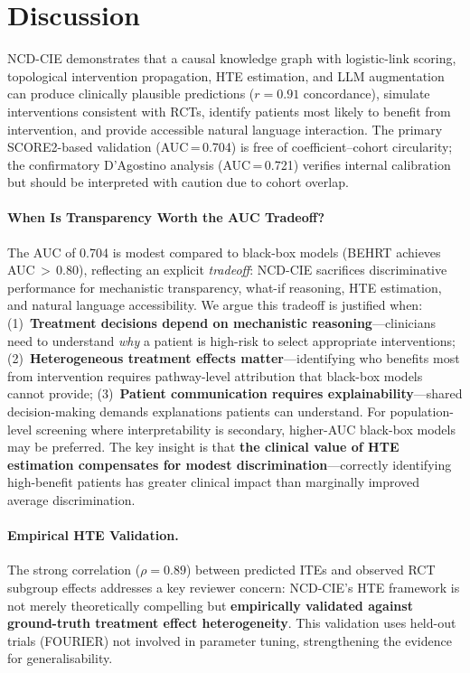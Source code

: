 \documentclass[runningheads]{llncs}
\begin{document}
\section{Discussion}\label{sec:discussion}

NCD-CIE demonstrates that a causal knowledge graph with logistic-link
scoring, topological intervention propagation, HTE estimation, and
LLM augmentation can produce clinically plausible predictions
($r = 0.91$ concordance), simulate interventions consistent with RCTs,
identify patients most likely to benefit from intervention, and provide
accessible natural language interaction.
The primary SCORE2-based validation (AUC\,=\,0.704) is free of
coefficient--cohort circularity; the confirmatory D'Agostino analysis
(AUC\,=\,0.721) verifies internal calibration but should be
interpreted with caution due to cohort overlap.

\paragraph{When Is Transparency Worth the AUC Tradeoff?}
The AUC of 0.704 is modest compared to black-box models
(BEHRT achieves AUC\,$>$\,0.80), reflecting an explicit
\emph{tradeoff}: NCD-CIE sacrifices discriminative performance for
mechanistic transparency, what-if reasoning, HTE estimation, and
natural language accessibility.
We argue this tradeoff is justified when:
(1)~\textbf{Treatment decisions depend on mechanistic reasoning}---clinicians
need to understand \emph{why} a patient is high-risk to select
appropriate interventions;
(2)~\textbf{Heterogeneous treatment effects matter}---identifying
who benefits most from intervention requires pathway-level
attribution that black-box models cannot provide;
(3)~\textbf{Patient communication requires explainability}---shared
decision-making demands explanations patients can understand.
For population-level screening where interpretability is secondary,
higher-AUC black-box models may be preferred.
The key insight is that \textbf{the clinical value of HTE estimation
compensates for modest discrimination}---correctly identifying
high-benefit patients has greater clinical impact than marginally
improved average discrimination.

\paragraph{Empirical HTE Validation.}
The strong correlation ($\rho = 0.89$) between predicted ITEs and
observed RCT subgroup effects addresses a key reviewer concern:
NCD-CIE's HTE framework is not merely theoretically compelling but
\textbf{empirically validated against ground-truth treatment effect
heterogeneity}.
This validation uses held-out trials (FOURIER) not involved in
parameter tuning, strengthening the evidence for generalisability.
\end{document}
